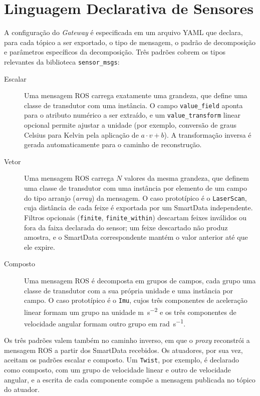 \documentclass[
    12pt,
    oneside,
    a4paper,
    chapter=TITLE,
    section=TITLE,
    english,
    brazil
]{abntex2}
\begin{document}
\section{Linguagem Declarativa de Sensores}
\label{sec:dsl}

A configuração do \textit{Gateway} é especificada em um arquivo YAML que
declara, para cada tópico a ser exportado, o tipo de mensagem, o padrão de
decomposição e parâmetros específicos da decomposição. Três padrões cobrem
os tipos relevantes da biblioteca \texttt{sensor\_msgs}:

\begin{description}
\item[Escalar] Uma mensagem ROS carrega exatamente uma grandeza, que define
uma classe de transdutor com uma instância. O campo \texttt{value\_field}
aponta para o atributo numérico a ser extraído, e um
\texttt{value\_transform} linear opcional permite ajustar a unidade (por
exemplo, conversão de graus Celsius para Kelvin pela aplicação de
\(a \cdot v + b\)). A transformação inversa é gerada automaticamente para
o caminho de reconstrução.

\item[Vetor] Uma mensagem ROS carrega \(N\) valores da mesma grandeza, que
definem uma classe de transdutor com uma instância por elemento de um
campo do tipo arranjo (\textit{array}) da mensagem. O caso prototípico é o \texttt{LaserScan}, cuja distância
de cada feixe é exportada por um SmartData independente. Filtros opcionais
(\texttt{finite}, \texttt{finite\_within}) descartam feixes inválidos ou
fora da faixa declarada do sensor; um feixe descartado não produz amostra,
e o SmartData correspondente mantém o valor anterior até que ele expire.

\item[Composto] Uma mensagem ROS é decomposta em grupos de campos, cada
grupo uma classe de transdutor com a sua própria unidade e uma instância
por campo. O caso prototípico é o \texttt{Imu}, cujos três componentes de
aceleração linear formam um grupo na unidade
\si{\meter\per\square\second} e os três componentes de velocidade
angular formam outro grupo em \si{\radian\per\second}.
\end{description}

Os três padrões valem também no caminho inverso, em que o
\textit{proxy} reconstrói a mensagem ROS a partir dos SmartData
recebidos. Os atuadores, por sua vez, aceitam os padrões escalar e
composto. Um \texttt{Twist}, por exemplo, é declarado como composto, com
um grupo de velocidade linear e outro de velocidade angular, e a escrita
de cada componente compõe a mensagem publicada no tópico do atuador.
\end{document}
